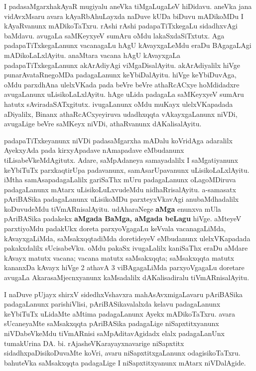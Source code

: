 \medskip

I padasaMgarxhakAyaR mugiyalu aneVka tiMgaLugaLeV hiDidavu. aneVka jana vidAvxMsaru avara kAyaRbAhuLayxda naDuve kUDa biDuvu mADikoMDu I kAyaRvanunx mADikoTaTxru. rAshi rAshi padapaTiTxkegaLu sidadhxvAgi baMdavu. avugaLa saMKeyxyeV sumAru oMdu lakaSxdaSiTxtutx. Aga padapaTiTxkegaLanunx vacanagaLu hAgU kAvayxgaLeMdu eraDu BAgagaLAgi mADikoLaLxlA\-yitu. \hbox{anaMtara} vacana hAgU kAvayxgaLa padapaTiTxkegaLanunx akArAdiyAgi viMgaDisalAyitu. akArAdiyalilx hiVge punarA\-vataRnegoMDa padagaLanunx keYbiDalAyitu. hiVge keYbiDuvAga, oMdu parxdhAna ulelxVKada pada beVre beVre athaRcACxye hoMdidadxre avugaLanunx uLisikoLaLxlAyitu. hAge uLida padagaLa saMKeyxyeV sumAru hatutx sAviradaSATxgitutx. ivugaLanunx oMdu muKayx ulelxVKapadada aDiyalilx, Binanx athaRcACxyeyiruva udadhxqqta vAkayxgaLanunx niVDi, avugaLige beVre saMKeyx niVDi, athaRvanunx dAKalisalAyitu.

\medskip

padapaTiTxkeyanunx niVDi padasaMgarxha mADalu koVridAga adaralilx AyekxyAda pada kirxyApadave nAmapadave eMbudanunx tiLisabeVkeMdAgitutx. Adare, saMpAdaneya samayadalilx I saMgatiyanunx keYbiTuTx parxkaqtirUpa padavanunx, samAsarUpa\-vanunx uLisikoLaLxlAyitu.  iMtha samAsapadagaLalilx gariSaThx mUru padagaLanunx oLagoMDiruva padagaLanunx mAtarx uLisikoLuLxvudeMdu nidhaRrisalAyitu. a-samasatx pAriBASika padagaLanunx uLisikoMDu parxteyxVkavAgi anubaMdhadalilx koDuvudeMdu tiVmARnisa\-lAyitu. udAharaNege \textbf{aMga} enunxva mUla pAriBASika padakekx \textbf{aMgada BaMga, aMgada beLagu} hiVge. aMteyeV parxti\-yoMdu padakUkx doreta parxyoVgagaLu keVvala vacanagaLiMda, kAvayxgaLiMda, saMsakxqqtadiMda doretideyeV eMbudanunx ulelxVKapadada pakakxdalilx sUcisa\-beVku. oMdu pakaSx ivugaLalilx  kaniSaThx eraDu aMdare kAvayx matutx vacana; vacana matutx saMsakxqqta; saMsakxqqta matutx kananxDa kAvayx hiVge 2 athavA 3 viBAgagaLiMda parxyoVgagaLu doretare avugaLa AkarasaMjecnxyanunx kaMsadalilx dAKalisadiralu tiVmARnisalAyitu. 

\newpage

I naDuve pUjayx shirxV sidedhxVshavxra mahAsAvxmigaLavaru pAriBASika padagaLanunx parishiVlisi, pAriBASikavalalxda kelavu padagaLanunx keYbiTuTx uLidaMte aMtima padagaLanunx Ayekx mADikoTaTxru. avara sUcaneyaMte saMsakxqqta pAriBASika padagaLige niSapxtitx\-yanunx niVDa\-beVkeMdu tiVmARnisi saMpAditavAgidadx elalx padagaLanUnx tumakUrina DA. bi. rAjasheVKarayayxnavarige niSapxtitx sidadhxpaDisi\-koDuvaMte koVri, avaru  niSapxtitxgaLanunx odagisikoTaTxru. bahuteVka saMsakxqqta padagaLige I niSapxtitxyanunx mAtarx niVDa\-lAgide. 

